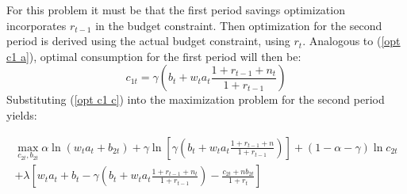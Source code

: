 \documentclass{article}
\begin{document}
For this problem it must be that the first period savings optimization incorporates $r_{t-1}$ in the budget constraint.  Then optimization for the second period is derived using the actual budget constraint, using $r_t$.  Analogous to (\ref{opt c1 a}), optimal consumption for the first period will then be:
\begin{equation}\label{opt c1 c2}
c_{1t} = \gamma(b_t + w_t a_t\frac{1+r_{t-1}+n_t}{1+r_{t-1}} )
\end{equation}
Substituting (\ref{opt c1 c}) into the maximization problem for the second period yields:

\begin{equation}
\begin{split}
\max_{c_{2t}, b_{2t}} \alpha \ln (w_t a_{t} + b_{2t})
+ \gamma \ln [ \gamma(b_t+w_t a_{t} \frac{1+r_{t-1}+n}{1+r_{t-1}}) ]
+ (1-\alpha-\gamma) \ln c_{2t}\\
+ \lambda [ w_t a_t + b_t - \gamma(b_t +w_t a_t \frac{1+r_{t-1}+n_t}{1+r_{t-1}} ) - \frac{c_{2t} + n b_{2t}}{1+r_t}]
\end{split}
\end{equation}
\end{document}
